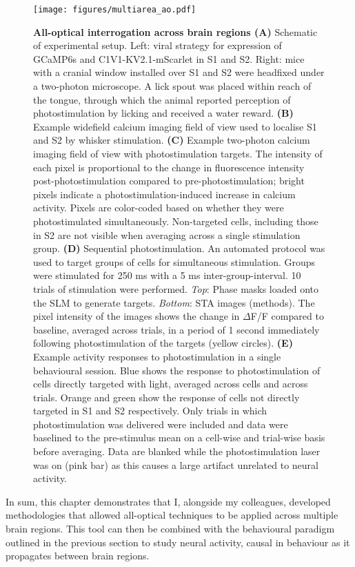 \begin{figure}[h]
\hspace*{-0.4in}
\texttt{[image: figures/multiarea\_ao.pdf]}
\caption[\textbf{All-optical interrogation across brain regions}]{
\textbf{All-optical interrogation across brain regions (A)} Schematic of experimental setup. Left: viral strategy for expression of GCaMP6s and C1V1-KV2.1-mScarlet in S1 and S2.  Right: mice with a cranial window installed over S1 and S2 were headfixed under a two-photon microscope. A lick spout was placed within reach of the tongue, through which the animal reported perception of photostimulation by licking and received a water reward. \textbf{(B)} Example widefield calcium imaging field of view used to localise S1 and S2 by whisker stimulation. \textbf{(C)} Example two-photon calcium imaging field of view with photostimulation targets. The intensity of each pixel is proportional to the change in fluorescence intensity post-photostimulation compared to pre-photostimulation; bright pixels indicate a photostimulation-induced increase in calcium activity. Pixels are color-coded based on whether they were photostimulated simultaneously. Non-targeted cells, including those in S2 are not visible when averaging across a single stimulation group.
\textbf{(D)} Sequential photostimulation. An
automated protocol was used to target groups of cells for simultaneous stimulation. Groups
were stimulated for 250 ms with a 5 ms inter-group-interval. 10 trials of stimulation were
performed. \textit{Top}: Phase masks loaded onto the SLM to generate targets. \textit{Bottom}: STA images (methods). The pixel intensity of the images shows the change in $\Delta$F/F compared to baseline, averaged across trials, in a period of 1 second immediately following photostimulation of the targets (yellow circles). \textbf{(E)} Example activity responses to photostimulation in a single behavioural session. Blue shows the response to photostimulation of cells directly targeted with light, averaged across cells and across trials. Orange and green show the response of cells not directly targeted in S1 and S2 respectively. Only trials in which photostimulation was delivered were included and data were baselined to the pre-stimulus mean on a cell-wise and trial-wise basis before averaging. Data are blanked while the photostimulation laser was on (pink bar) as this causes a large artifact unrelated to neural activity.
} 
\label{fig:s1s2}
\end{figure}

In sum, this chapter demonstrates that I, alongside my colleagues, developed methodologies that allowed all-optical techniques to be applied across multiple brain regions. This tool can then be combined with the behavioural paradigm outlined in the previous section to study neural activity, causal in behaviour as it propagates between brain regions.